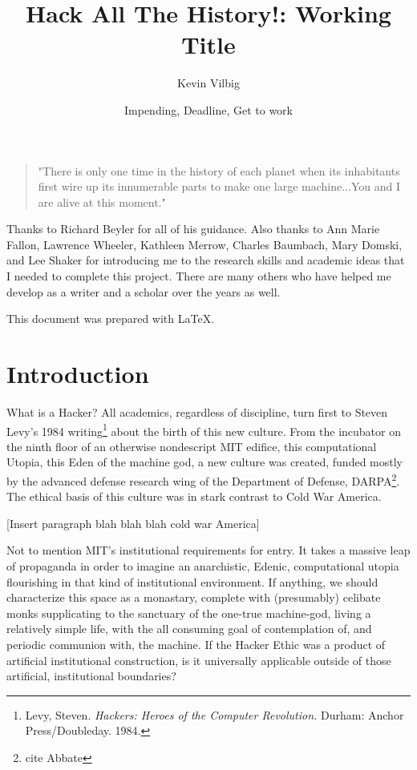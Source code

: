 \documentclass[11pt]{article}
\begin{document}
\title{Hack All The History!: Working Title}
\author{Kevin Vilbig}
\date{Impending, Deadline, Get to work}
\maketitle

\begin{quote}
"There is only one time in the history of each planet when its inhabitants first wire up its innumerable parts to make one large machine...You and I are alive at this moment." 

\end{quote}

Thanks to Richard Beyler for all of his guidance. Also thanks to Ann Marie Fallon, Lawrence Wheeler, Kathleen Merrow, Charles Baumbach, Mary Domski, and Lee Shaker for introducing me to the research skills and academic ideas that I needed to complete this project. There are many others who have helped me develop as a writer and a scholar over the years as well.

\begin{center}
This document was prepared with \LaTeX.
\end{center}

\newpage

\tableofcontents

\newpage

\section{Introduction}

What is a Hacker? All academics, regardless of discipline, turn first to Steven Levy’s 1984 writing\footnote{Levy, Steven. \emph{Hackers: Heroes of the Computer Revolution.} Durham: Anchor Press/Doubleday. 1984.} about the birth of this new culture. From the incubator on the ninth floor of an otherwise nondescript MIT edifice, this computational Utopia, this Eden of the machine god, a new culture was created, funded mostly by the advanced defense research wing of the Department of Defense, DARPA\footnote{cite Abbate}. The ethical basis of this culture was in stark contrast to Cold War America. 

[Insert paragraph blah blah blah cold war America]

Not to mention MIT’s institutional requirements for entry. It takes a massive leap of propaganda in order to imagine an anarchistic, Edenic, computational utopia flourishing in that kind of institutional environment. If anything, we should characterize this space as a monastary, complete with (presumably) celibate monks supplicating to the sanctuary of the one-true machine-god, living a relatively simple life, with the all consuming goal of contemplation of, and periodic communion with, the machine. If the Hacker Ethic was a product of artificial institutional construction, is it universally applicable outside of those artificial, institutional boundaries?
\end{document}
